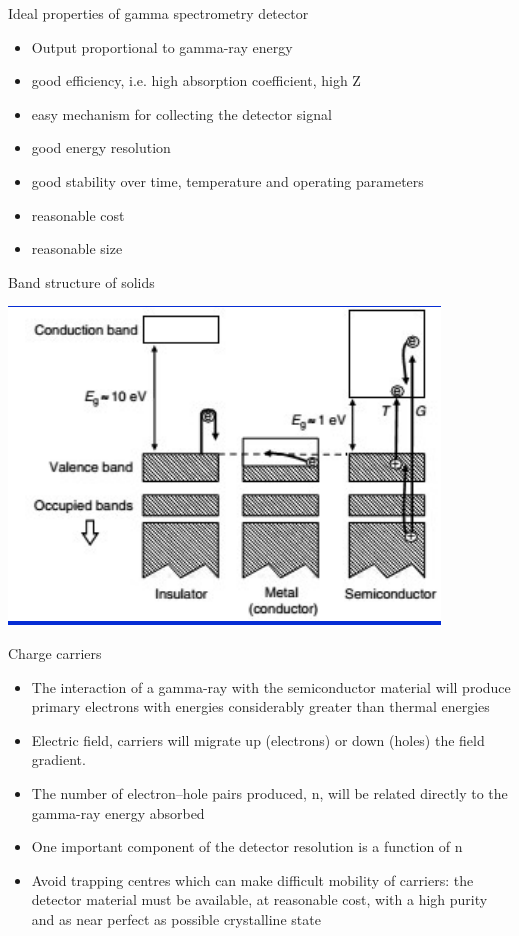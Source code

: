 \begin{frame}{Ideal properties of gamma spectrometry detector}


{\small
\begin{itemize}
\item Output proportional to gamma-ray energy 
\item good efficiency, i.e. high absorption coefficient, high Z 
\item easy mechanism for collecting the detector signal 
\item good energy resolution 
\item good stability over time, temperature and operating parameters 
\item reasonable cost
\item reasonable size
\end{itemize}
}


\end{frame}

\begin{frame}{Band structure of solids}

\centering
\includegraphics[scale=0.6]{figures/bands.png}

\end{frame}

\begin{frame}{Charge carriers}


{\small
\begin{itemize}
\item The interaction of a gamma-ray with the semiconductor material will produce primary electrons with energies considerably greater than thermal energies 
\item Electric field, carriers will migrate up (electrons) or down (holes) the field gradient. 
\item The number of electron–hole pairs produced, n, will be related directly to the gamma-ray energy absorbed 
\item One important component of the detector resolution is a function of n 
\item Avoid trapping centres which can make difficult mobility of carriers: the detector material must be available, at reasonable cost, with a high purity and as near perfect as possible crystalline state
\end{itemize}
}


\end{frame}

